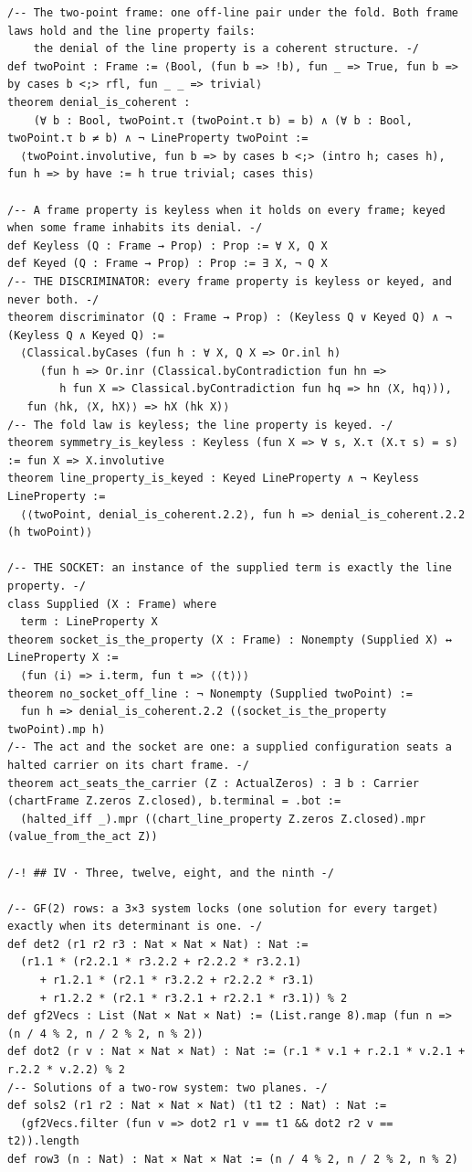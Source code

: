 \documentclass[10pt,twocolumn]{article}
\begin{document}
\begin{Verbatim}
/-- The two-point frame: one off-line pair under the fold. Both frame laws hold and the line property fails:
    the denial of the line property is a coherent structure. -/
def twoPoint : Frame := ⟨Bool, (fun b => !b), fun _ => True, fun b => by cases b <;> rfl, fun _ _ => trivial⟩
theorem denial_is_coherent :
    (∀ b : Bool, twoPoint.τ (twoPoint.τ b) = b) ∧ (∀ b : Bool, twoPoint.τ b ≠ b) ∧ ¬ LineProperty twoPoint :=
  ⟨twoPoint.involutive, fun b => by cases b <;> (intro h; cases h), fun h => by have := h true trivial; cases this⟩

/-- A frame property is keyless when it holds on every frame; keyed when some frame inhabits its denial. -/
def Keyless (Q : Frame → Prop) : Prop := ∀ X, Q X
def Keyed (Q : Frame → Prop) : Prop := ∃ X, ¬ Q X
/-- THE DISCRIMINATOR: every frame property is keyless or keyed, and never both. -/
theorem discriminator (Q : Frame → Prop) : (Keyless Q ∨ Keyed Q) ∧ ¬ (Keyless Q ∧ Keyed Q) :=
  ⟨Classical.byCases (fun h : ∀ X, Q X => Or.inl h)
     (fun h => Or.inr (Classical.byContradiction fun hn =>
        h fun X => Classical.byContradiction fun hq => hn ⟨X, hq⟩)),
   fun ⟨hk, ⟨X, hX⟩⟩ => hX (hk X)⟩
/-- The fold law is keyless; the line property is keyed. -/
theorem symmetry_is_keyless : Keyless (fun X => ∀ s, X.τ (X.τ s) = s) := fun X => X.involutive
theorem line_property_is_keyed : Keyed LineProperty ∧ ¬ Keyless LineProperty :=
  ⟨⟨twoPoint, denial_is_coherent.2.2⟩, fun h => denial_is_coherent.2.2 (h twoPoint)⟩

/-- THE SOCKET: an instance of the supplied term is exactly the line property. -/
class Supplied (X : Frame) where
  term : LineProperty X
theorem socket_is_the_property (X : Frame) : Nonempty (Supplied X) ↔ LineProperty X :=
  ⟨fun ⟨i⟩ => i.term, fun t => ⟨⟨t⟩⟩⟩
theorem no_socket_off_line : ¬ Nonempty (Supplied twoPoint) :=
  fun h => denial_is_coherent.2.2 ((socket_is_the_property twoPoint).mp h)
/-- The act and the socket are one: a supplied configuration seats a halted carrier on its chart frame. -/
theorem act_seats_the_carrier (Z : ActualZeros) : ∃ b : Carrier (chartFrame Z.zeros Z.closed), b.terminal = .bot :=
  (halted_iff _).mpr ((chart_line_property Z.zeros Z.closed).mpr (value_from_the_act Z))

/-! ## IV · Three, twelve, eight, and the ninth -/

/-- GF(2) rows: a 3×3 system locks (one solution for every target) exactly when its determinant is one. -/
def det2 (r1 r2 r3 : Nat × Nat × Nat) : Nat :=
  (r1.1 * (r2.2.1 * r3.2.2 + r2.2.2 * r3.2.1)
     + r1.2.1 * (r2.1 * r3.2.2 + r2.2.2 * r3.1)
     + r1.2.2 * (r2.1 * r3.2.1 + r2.2.1 * r3.1)) % 2
def gf2Vecs : List (Nat × Nat × Nat) := (List.range 8).map (fun n => (n / 4 % 2, n / 2 % 2, n % 2))
def dot2 (r v : Nat × Nat × Nat) : Nat := (r.1 * v.1 + r.2.1 * v.2.1 + r.2.2 * v.2.2) % 2
/-- Solutions of a two-row system: two planes. -/
def sols2 (r1 r2 : Nat × Nat × Nat) (t1 t2 : Nat) : Nat :=
  (gf2Vecs.filter (fun v => dot2 r1 v == t1 && dot2 r2 v == t2)).length
def row3 (n : Nat) : Nat × Nat × Nat := (n / 4 % 2, n / 2 % 2, n % 2)


\end{Verbatim}
\end{document}
